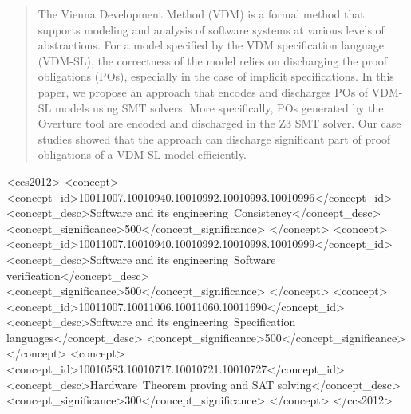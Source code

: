 \documentclass[sigconf]{acmart}
\begin{document}
\begin{abstract}
The Vienna Development Method (VDM) is a formal method that supports modeling and analysis of software systems at various levels of abstractions. For a model specified by the VDM specification language (VDM-SL), the correctness of the model relies on discharging the proof obligations (POs), especially in the case of implicit specifications. In this paper, we propose an approach that encodes and discharges POs of VDM-SL models using SMT solvers. More specifically, POs generated by the Overture tool are encoded and discharged in the Z3 SMT solver. Our case studies showed that the approach can discharge significant part of proof obligations of a VDM-SL model efficiently.
\end{abstract}

%
%
\begin{CCSXML}
<ccs2012>
 <concept>
  <concept_id>10011007.10010940.10010992.10010993.10010996</concept_id>
  <concept_desc>Software and its engineering~Consistency</concept_desc>
  <concept_significance>500</concept_significance>
 </concept>
 <concept>
  <concept_id>10011007.10010940.10010992.10010998.10010999</concept_id>
  <concept_desc>Software and its engineering~Software verification</concept_desc>
  <concept_significance>500</concept_significance>
 </concept>
 <concept>
  <concept_id>10011007.10011006.10011060.10011690</concept_id>
  <concept_desc>Software and its engineering~Specification languages</concept_desc>
  <concept_significance>500</concept_significance>
 </concept>
 <concept>
  <concept_id>10010583.10010717.10010721.10010727</concept_id>
  <concept_desc>Hardware~Theorem proving and SAT solving</concept_desc>
  <concept_significance>300</concept_significance>
 </concept>
</ccs2012>  
\end{CCSXML}


\end{document}
